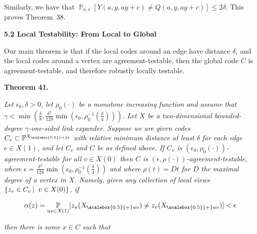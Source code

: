 \documentclass[10pt,a4paper]{article}
\begin{document}
Similarly, we have that $\operatorname*{\mathbb{P}}_{a,c}[Y(a,y,ay+c)\not=Q(a,y,ay+c)]\leq 2\delta$. This proves Theorem 38.\par






\par\medskip\noindent\textbf{
5.2 Local Testability: From Local to Global}\par




Our main theorem is that if the local codes around an edge have distance $\delta$, and the local codes around a vertex are agreement-testable, then the global code $C$ is agreement-testable, and therefore robustly locally testable.\par





\par\medskip\noindent\textbf{
\textbf{Theorem 41}\textbf{.}
}\par



\emph{Let $\epsilon_{0},\delta>0$, let $\rho_{0}(\cdot)$ be a monotone increasing function and assume that $\gamma<\min(\frac{\delta}{8},\frac{\delta^{2}}{128}\min(\epsilon_{0},\rho_{0}^{-1}(\frac{\delta}{4})))$.
Let $X$ be a two-dimensional bounded-degree $\gamma$-one-sided link expander.
Suppose we are given codes $C_{e}\subset\mathbb{F}^{{X}_{\scalebox{0.5}{+}e}}$ with relative minimum distance at least $\delta$ for each edge $e\in X(1)$, and let $C_{v}$ and $C$ be as defined above.
If $C_{v}$ is $(\epsilon_{0},\rho_{0}(\cdot))$-agreement-testable for all $v\in X(0)$ then $C$ is $(\epsilon,\rho(\cdot))$-agreement-testable, where
$\epsilon=\frac{\delta^{2}}{128}\min(\epsilon_{0},\rho_{0}^{-1}(\frac{\delta}{4}))$ and where $\rho(t)=Dt$ for $D$ the maximal degree of a vertex in $X$. Namely, given any collection of local views $\left\{z_{v}\in C_{v}\left|\;\vphantom{z_{v}\in C_{v}v\in X(0)}\right.v\in X(0)\right\}$, if}\par


\[\begin{gathered}
\alpha(z)=\operatorname*{\mathbb{P}}_{uv\in X(1)}[z_{u}({X}_{\scalebox{0.5}{+}uv})\neq z_{v}({X}_{\scalebox{0.5}{+}uv})]<\epsilon
\end{gathered}\]


\emph{then there is some $x\in C$ such that}\par
\end{document}
